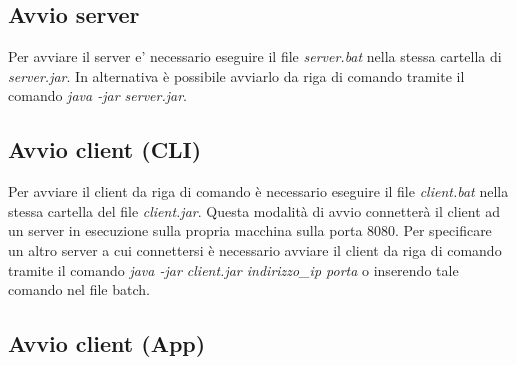 \subsection{Avvio server}
\noindent Per avviare il server e' necessario eseguire il file \textit{server.bat} nella stessa cartella di \textit{server.jar}. In alternativa è possibile avviarlo da riga di comando tramite il comando \textit{java -jar server.jar}.

\subsection{Avvio client (CLI)}
\noindent Per avviare il client da riga di comando è necessario eseguire il file \textit{client.bat} nella stessa cartella del file \textit{client.jar}. Questa modalità di avvio connetterà il client ad un server in esecuzione sulla propria macchina sulla porta 8080. Per specificare un altro server a cui connettersi è necessario
avviare il client da riga di comando tramite il comando \textit{java -jar client.jar indirizzo\_ip porta} o inserendo tale comando nel file batch.

\subsection{Avvio client (App)}
\noindent

